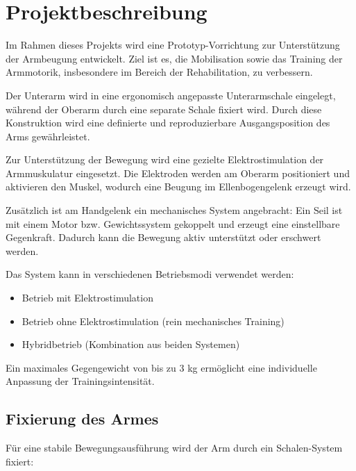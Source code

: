 \documentclass{article}
\begin{document}
\section{Projektbeschreibung}

Im Rahmen dieses Projekts wird eine Prototyp-Vorrichtung zur Unterstützung der Armbeugung entwickelt. Ziel ist es, die Mobilisation sowie das Training der Armmotorik, insbesondere im Bereich der Rehabilitation, zu verbessern.

Der Unterarm wird in eine ergonomisch angepasste Unterarmschale eingelegt, während der Oberarm durch eine separate Schale fixiert wird. Durch diese Konstruktion wird eine definierte und reproduzierbare Ausgangsposition des Arms gewährleistet.

Zur Unterstützung der Bewegung wird eine gezielte Elektrostimulation der Armmuskulatur eingesetzt. Die Elektroden werden am Oberarm positioniert und aktivieren den Muskel, wodurch eine Beugung im Ellenbogengelenk erzeugt wird.

Zusätzlich ist am Handgelenk ein mechanisches System angebracht: Ein Seil ist mit einem Motor bzw. Gewichtssystem gekoppelt und erzeugt eine einstellbare Gegenkraft. Dadurch kann die Bewegung aktiv unterstützt oder erschwert werden.

Das System kann in verschiedenen Betriebsmodi verwendet werden:
\begin{itemize}
\item Betrieb mit Elektrostimulation
\item Betrieb ohne Elektrostimulation (rein mechanisches Training)
\item Hybridbetrieb (Kombination aus beiden Systemen)
\end{itemize}

Ein maximales Gegengewicht von bis zu 3 kg ermöglicht eine individuelle Anpassung der Trainingsintensität.

\subsection{Fixierung des Armes}

Für eine stabile Bewegungsausführung wird der Arm durch ein Schalen-System fixiert:
\end{document}
